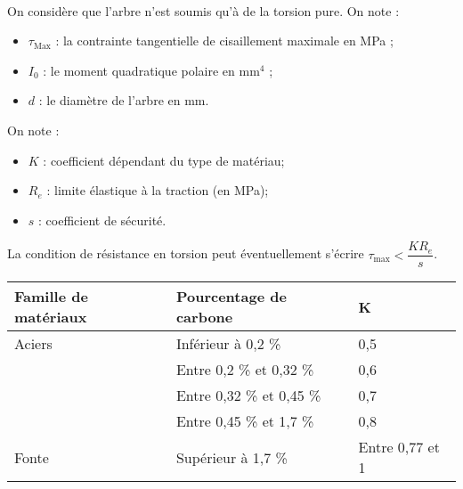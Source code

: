\ifprof
\begin{corrige}~\\
\end{corrige}
\else
\fi

On considère que l’arbre n’est soumis qu’à de la torsion pure.
On note :
\begin{itemize}
\item $\tau_{\text{Max}}$ : la contrainte tangentielle de cisaillement maximale en MPa ;
\item $I_0$ : le moment quadratique polaire en $\text{mm}^4$ ;
\item $d$ : le diamètre de l’arbre en mm.
\end{itemize}
On note :
\begin{itemize}
\item $K$ : coefficient dépendant du type de matériau;
\item $R_e$ : limite élastique à la traction (en MPa);
\item $s$ : coefficient de sécurité.
\end{itemize}

La condition de résistance en torsion peut éventuellement s'écrire $\tau_{\text{max}}< \dfrac{K R_e}{ s}$.

\begin{center}
\begin{tabular}{p{2cm}lp{1.5cm}}
\hline
Famille de matériaux & Pourcentage de carbone & K \\ \hline \hline
Aciers & Inférieur à 0,2 \%	&0,5 \\ \hline
&Entre 0,2 \% et 0,32 \%	&0,6 \\ \hline
&Entre 0,32 \% et 0,45 \%	&0,7 \\ \hline
&Entre 0,45 \% et 1,7 \%	&0,8 \\ \hline
Fonte&Supérieur à 1,7 \%	&Entre 0,77 et 1 \\ \hline
\end{tabular}
\end{center}


\ifprof
\begin{corrige}~\\
\end{corrige}
\else
\fi

